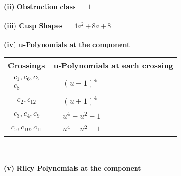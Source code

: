 \documentclass[1p]{elsarticle_modified}
\theoremstyle{definition}
\begin{document}
\flushleft \textbf{(ii) Obstruction class $= 1$}\\~\\
\flushleft \textbf{(iii) Cusp Shapes $= 4 a^2+8 a+8$}\\~\\
\newpage\renewcommand{\arraystretch}{1}
\flushleft \textbf{(iv) u-Polynomials at the component}\newline \\
\begin{tabular}{m{50pt}|m{274pt}}
Crossings & \hspace{64pt}u-Polynomials at each crossing \\
\hline $$\begin{aligned}c_{1},c_{6},c_{7}\\c_{8}\end{aligned}$$&$\begin{aligned}
&(u-1)^4
\end{aligned}$\\
\hline $$\begin{aligned}c_{2},c_{12}\end{aligned}$$&$\begin{aligned}
&(u+1)^4
\end{aligned}$\\
\hline $$\begin{aligned}c_{3},c_{4},c_{9}\end{aligned}$$&$\begin{aligned}
&u^4- u^2-1
\end{aligned}$\\
\hline $$\begin{aligned}c_{5},c_{10},c_{11}\end{aligned}$$&$\begin{aligned}
&u^4+u^2-1
\end{aligned}$\\
\hline
\end{tabular}\\~\\
\newpage\renewcommand{\arraystretch}{1}
\flushleft \textbf{(v) Riley Polynomials at the component}\newline \\
\end{document}
